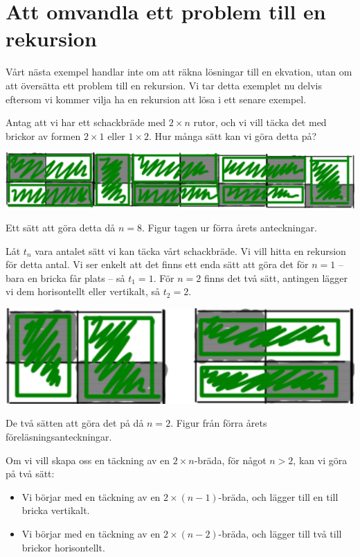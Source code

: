 \documentclass[nobib]{tufte-handout}
\begin{document}
\section{Att omvandla ett problem till en rekursion}

Vårt nästa exempel handlar inte om att räkna lösningar till en ekvation, utan om att översätta ett problem till en rekursion. Vi tar detta exemplet nu delvis eftersom vi kommer vilja ha en rekursion att lösa i ett senare exempel.

\begin{example}
  Antag att vi har ett schackbräde med $2\times n$ rutor, och vi vill täcka det med brickor av formen $2\times 1$ eller $1\times 2$. Hur många sätt kan vi göra detta på?

  \begin{marginfigure}
    \includegraphics{graphics/checkerboard_tiling.png}
    \caption{Ett sätt att göra detta då $n=8$. Figur tagen ur förra årets anteckningar.}
  \end{marginfigure}

  Låt $t_n$ vara antalet sätt vi kan täcka vårt schackbräde. Vi vill hitta en rekursion för detta antal. Vi ser enkelt att det finns ett enda sätt att göra det för $n=1$ -- bara en bricka får plats -- så $t_1 = 1$. För $n=2$ finns det två sätt, antingen lägger vi dem horisontellt eller vertikalt, så $t_2 = 2$.

  \begin{marginfigure}
    \includegraphics{graphics/checkerboard_tiling_n_2.png}
    \caption{De två sätten att göra det på då $n=2$. Figur från förra årets föreläsningsanteckningar.}
  \end{marginfigure}

  Om vi vill skapa oss en täckning av en $2\times n$-bräda, för något $n > 2$, kan vi göra på två sätt:
  \begin{itemize}
    \item Vi börjar med en täckning av en $2\times(n-1)$-bräda, och lägger till en till bricka vertikalt.
    \item Vi börjar med en täckning av en $2\times(n-2)$-bräda, och lägger till två till brickor horisontellt.
  \end{itemize}


\end{example}
\end{document}
